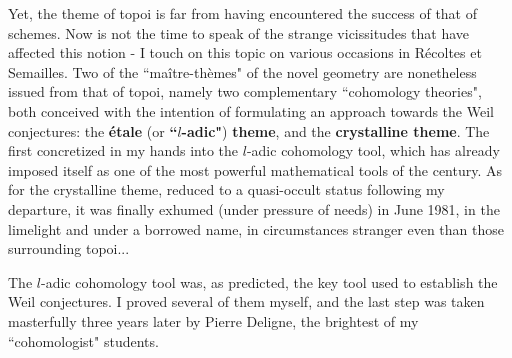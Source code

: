 Yet, the theme of topoi is far from having encountered the success of that of schemes. Now is not the time to speak of the strange vicissitudes that have affected this notion - I touch on this topic on various occasions in R\'ecoltes et Semailles. Two of the ``ma\^itre-th\`emes" of the novel geometry are nonetheless issued from that of topoi, namely two complementary ``cohomology theories", both conceived with the intention of formulating an approach towards the Weil conjectures: the \textbf{\'etale} (or \textbf{``$l$-adic"}) \textbf{theme}, and the \textbf{crystalline theme}. The first concretized in my hands into the $l$-adic cohomology tool, which has already imposed itself as one of the most powerful mathematical tools of the century. As for the crystalline theme, reduced to a quasi-occult status following my departure, it was finally exhumed (under pressure of needs) in June 1981, in the limelight and under a borrowed name, in circumstances stranger even than those surrounding topoi...

The $l$-adic cohomology tool was, as predicted, the key tool used to establish the Weil conjectures. I proved several of them myself, and the last step was taken masterfully three years later by Pierre Deligne, the brightest of my ``cohomologist" students.

